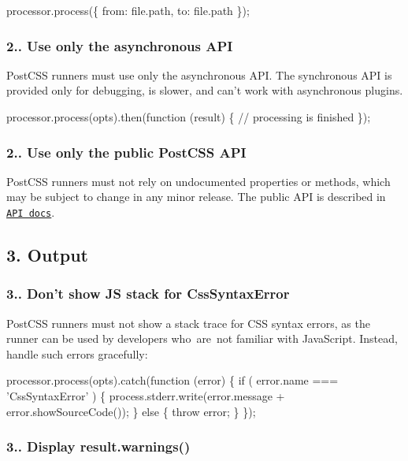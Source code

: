 \begin{DoxyCode}
processor.process(\{ from: file.path, to: file.path \});
\end{DoxyCode}


\subsubsection*{2.. Use only the asynchronous A\+PI}

Post\+C\+SS runners must use only the asynchronous A\+PI. The synchronous A\+PI is provided only for debugging, is slower, and can’t work with asynchronous plugins.


\begin{DoxyCode}
processor.process(opts).then(function (result) \{
    // processing is finished
\});
\end{DoxyCode}


\subsubsection*{2.. Use only the public Post\+C\+SS A\+PI}

Post\+C\+SS runners must not rely on undocumented properties or methods, which may be subject to change in any minor release. The public A\+PI is described in \href{http://api.postcss.org/}{\tt A\+PI docs}.

\subsection*{3. Output}

\subsubsection*{3.. Don’t show JS stack for {\ttfamily Css\+Syntax\+Error}}

Post\+C\+SS runners must not show a stack trace for C\+SS syntax errors, as the runner can be used by developers who are not familiar with Java\+Script. Instead, handle such errors gracefully\+:


\begin{DoxyCode}
processor.process(opts).catch(function (error) \{
    if ( error.name === 'CssSyntaxError' ) \{
        process.stderr.write(error.message + error.showSourceCode());
    \} else \{
        throw error;
    \}
\});
\end{DoxyCode}


\subsubsection*{3.. Display {\ttfamily result.\+warnings()}}

